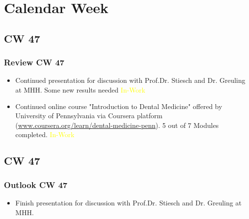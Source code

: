 \section{Calendar Week}
\subsection{CW 47}
\begin{frame}
  \frametitle{Review CW 47}
	\begin{itemize}
		\item Continued presentation for discussion with Prof.Dr. Stiesch and Dr. Greuling at MHH. Some new results needed \textcolor{yellow}{In-Work}
		\item Continued online course "Introduction to Dental Medicine" offered by University of Pennsylvania via Coursera platform (\url{www.coursera.org/learn/dental-medicine-penn}). 5 out of 7 Modules completed. \textcolor{yellow}{In-Work}
	\end{itemize}
\end{frame}


\subsection{CW 47}
\begin{frame}
  \frametitle{Outlook CW 47}
	\begin{itemize}
		\item Finish presentation for discussion with Prof.Dr. Stiesch and Dr. Greuling at MHH.
	\end{itemize}
\end{frame}

